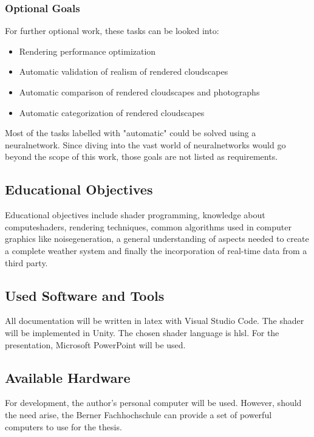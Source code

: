 \subsubsection{Optional Goals}
\label{section:goals:optional}
For further optional work, these tasks can be looked into:
\begin{itemize}
    \item Rendering performance optimization
    \item Automatic validation of realism of rendered cloudscapes
    \item Automatic comparison of rendered cloudscapes and photographs
    \item Automatic categorization of rendered cloudscapes
\end{itemize}

\noindent
Most of the tasks labelled with "automatic" could be solved using a \gls{neuralnetwork}.
Since diving into the vast world of \gls{neuralnetwork}s would go beyond the scope of this work, those goals are not listed as requirements.

\subsection{Educational Objectives}
Educational objectives include \gls{shader} programming, knowledge about \gls{computeshader}s, rendering techniques, common algorithms used in computer graphics like \gls{noisegeneration}, a general understanding of aspects needed to create a complete weather system and finally the incorporation of real-time data from a third party.

\subsection{Used Software and Tools}
All documentation will be written in \gls{latex} with Visual Studio Code.
The \gls{shader} will be implemented in Unity. The chosen \gls{shader} language is \gls{hlsl}.
For the presentation, Microsoft PowerPoint will be used.

\subsection{Available Hardware}
For development, the author's personal computer will be used. However, should the need arise, the Berner Fachhochschule can provide a set of powerful computers to use for the thesis.